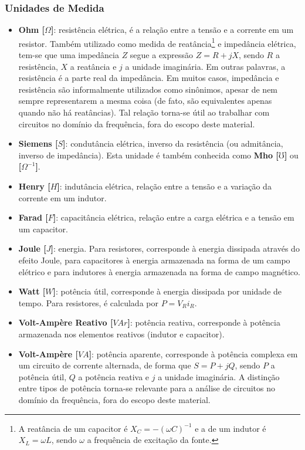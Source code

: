 \documentclass{article}
\numberwithin{equation}{section}
\begin{document}
\subsubsection{Unidades de Medida}
\label{subsubsec:unidades}
\begin{itemize}
    \item \textbf{Ohm [$\Omega$]}: resistência elétrica, é a relação entre a tensão e a corrente em um resistor. Também utilizado como medida de reatância\footnote{A reatância de um capacitor é $X_C=-(\omega C)^{-1}$ e a de um indutor é $X_L=\omega L$, sendo $\omega$ a frequência de excitação da fonte.} e impedância elétrica, tem-se que uma impedância $Z$ segue a expressão $Z = R + jX$, sendo $R$ a resistência, $X$ a reatância e $j$ a unidade imaginária. Em outras palavras, a resistência é a parte real da impedância. Em muitos casos, impedância e resistência são informalmente utilizados como sinônimos, apesar de nem sempre representarem a mesma coisa (de fato, são equivalentes apenas quando não há reatâncias). Tal relação torna-se útil ao trabalhar com circuitos no domínio da frequência, fora do escopo deste material.
    \item \textbf{Siemens [$S$]}: condutância elétrica, inverso da resistência (ou admitância, inverso de impedância). Esta unidade é também conhecida como \textbf{Mho [$\mho$]} ou \textbf{[$\Omega^{-1}$]}.
    \item \textbf{Henry [$H$]}: indutância elétrica, relação entre a tensão e a variação da corrente em um indutor.
    \item \textbf{Farad [$F$]}: capacitância elétrica, relação entre a carga elétrica e a tensão em um capacitor.
    \item \textbf{Joule [$J$]}: energia. Para resistores, corresponde à energia dissipada através do efeito Joule, para capacitores à energia armazenada na forma de um campo elétrico e para indutores à energia armazenada na forma de campo magnético.
    \item \textbf{Watt [$W$]}: potência útil, corresponde à energia dissipada por unidade de tempo. Para resistores, é calculada por $P=V_Ri_R$.
    \item \textbf{Volt-Ampère Reativo [$VAr$]}: potência reativa, corresponde à potência armazenada nos elementos reativos (indutor e capacitor).
    \item \textbf{Volt-Ampère [$VA$]}: potência aparente, corresponde à potência complexa em um circuito de corrente alternada, de forma que $S = P + jQ$, sendo $P$ a potência útil, $Q$ a potência reativa e $j$ a unidade imaginária. A distinção entre tipos de potência torna-se relevante para a análise de circuitos no domínio da frequência, fora do escopo deste material.
\end{itemize}
\end{document}
